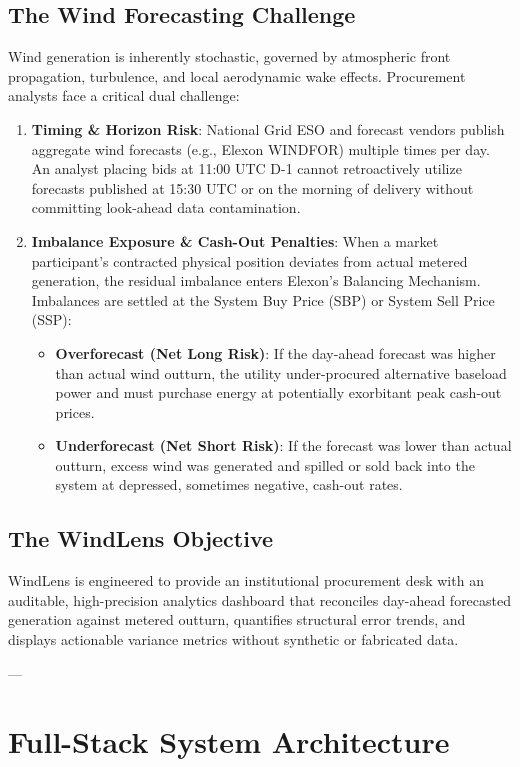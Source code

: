 \documentclass[11pt,a4paper]{article}
\begin{document}
\subsection{The Wind Forecasting Challenge}
Wind generation is inherently stochastic, governed by atmospheric front propagation, turbulence, and local aerodynamic wake effects. Procurement analysts face a critical dual challenge:
\begin{enumerate}[leftmargin=*]
    \item \textbf{Timing \& Horizon Risk}: National Grid ESO and forecast vendors publish aggregate wind forecasts (e.g., Elexon WINDFOR) multiple times per day. An analyst placing bids at 11:00 UTC D-1 cannot retroactively utilize forecasts published at 15:30 UTC or on the morning of delivery without committing look-ahead data contamination.
    \item \textbf{Imbalance Exposure \& Cash-Out Penalties}: When a market participant's contracted physical position deviates from actual metered generation, the residual imbalance enters Elexon's Balancing Mechanism. Imbalances are settled at the System Buy Price (SBP) or System Sell Price (SSP):
    \begin{itemize}
        \item \textbf{Overforecast (Net Long Risk)}: If the day-ahead forecast was higher than actual wind outturn, the utility under-procured alternative baseload power and must purchase energy at potentially exorbitant peak cash-out prices.
        \item \textbf{Underforecast (Net Short Risk)}: If the forecast was lower than actual outturn, excess wind was generated and spilled or sold back into the system at depressed, sometimes negative, cash-out rates.
    \end{itemize}
\end{enumerate}

\subsection{The WindLens Objective}
WindLens is engineered to provide an institutional procurement desk with an auditable, high-precision analytics dashboard that reconciles day-ahead forecasted generation against metered outturn, quantifies structural error trends, and displays actionable variance metrics without synthetic or fabricated data.

---

\section{Full-Stack System Architecture}
\end{document}
